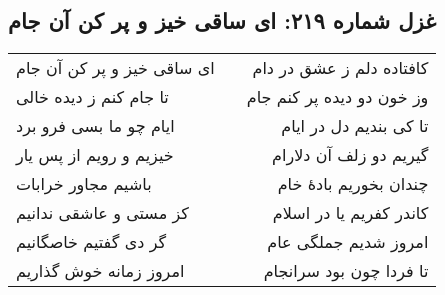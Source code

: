 \begin{center}
\section*{غزل شماره ۲۱۹: ای ساقی خیز و پر کن آن جام}
\label{sec:219}
\begin{longtable}{l p{0.5cm} r}
ای ساقی خیز و پر کن آن جام
&&
کافتاده دلم ز عشق در دام
\\
تا جام کنم ز دیده خالی
&&
وز خون دو دیده پر کنم جام
\\
ایام چو ما بسی فرو برد
&&
تا کی بندیم دل در ایام
\\
خیزیم و رویم از پس یار
&&
گیریم دو زلف آن دلارام
\\
باشیم مجاور خرابات
&&
چندان بخوریم بادهٔ خام
\\
کز مستی و عاشقی ندانیم
&&
کاندر کفریم یا در اسلام
\\
گر دی گفتیم خاصگانیم
&&
امروز شدیم جملگی عام
\\
امروز زمانه خوش گذاریم
&&
تا فردا چون بود سرانجام
\\
\end{longtable}
\end{center}
